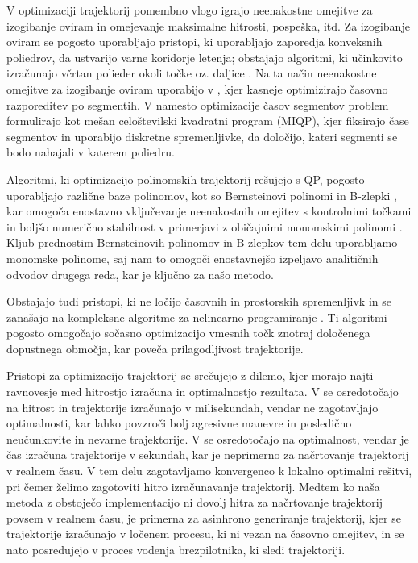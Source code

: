 \documentclass[mat2, tisk]{fmfdelo}
\begin{document}
V optimizaciji trajektorij pomembno vlogo igrajo neenakostne omejitve za izogibanje oviram in omejevanje maksimalne hitrosti, pospeška, itd. Za izogibanje oviram se pogosto uporabljajo pristopi, ki uporabljajo zaporedja konveksnih poliedrov, da ustvarijo varne koridorje letenja; obstajajo algoritmi, ki učinkovito izračunajo včrtan polieder okoli točke \cite{deits2015computing} oz. daljice \cite{liu2017planning}. Na ta način neenakostne omejitve za izogibanje oviram uporabijo v \cite{sun2021fast}, kjer kasneje optimizirajo časovno razporeditev po segmentih. V \cite{tordesillas2021faster} namesto optimizacije časov segmentov problem formulirajo kot mešan celoštevilski kvadratni program (MIQP), kjer fiksirajo čase segmentov in uporabijo diskretne spremenljivke, da določijo, kateri segmenti se bodo nahajali v katerem poliedru.

Algoritmi, ki optimizacijo polinomskih trajektorij rešujejo s \ac{QP}, pogosto uporabljajo različne baze polinomov, kot so Bernsteinovi polinomi \cite{sun2021fast, tordesillas2021faster} in B-zlepki \cite{zhou2020ego}, kar omogoča enostavno vključevanje neenakostnih omejitev s kontrolnimi točkami in boljšo numerično stabilnost v primerjavi z običajnimi monomskimi polinomi \cite{runge1901}. Kljub prednostim Bernsteinovih polinomov in B-zlepkov tem delu uporabljamo monomske polinome, saj nam to omogoči enostavnejšo izpeljavo analitičnih odvodov drugega reda, kar je ključno za našo metodo.

Obstajajo tudi pristopi, ki ne ločijo časovnih in prostorskih spremenljivk \cite{fridovich2018planning} in se zanašajo na kompleksne algoritme za nelinearno programiranje \cite{wachter2006implementation}. Ti algoritmi pogosto omogočajo sočasno optimizacijo vmesnih točk znotraj določenega dopustnega območja, kar poveča prilagodljivost trajektorije.

Pristopi za optimizacijo trajektorij se srečujejo z dilemo, kjer morajo najti ravnovesje med hitrostjo izračuna in optimalnostjo rezultata. V \cite{zhou2020ego} se osredotočajo na hitrost in trajektorije izračunajo v milisekundah, vendar ne zagotavljajo optimalnosti, kar lahko povzroči bolj agresivne manevre in posledično neučunkovite in nevarne trajektorije. V \cite{richter2016polynomial} se osredotočajo na optimalnost, vendar je čas izračuna trajektorije v sekundah, kar je neprimerno za načrtovanje trajektorij v realnem času. V tem delu zagotavljamo konvergenco k lokalno optimalni rešitvi, pri čemer želimo zagotoviti hitro izračunavanje trajektorij. Medtem ko naša metoda z obstoječo implementacijo ni dovolj hitra za načrtovanje trajektorij povsem v realnem času, je primerna za asinhrono generiranje trajektorij, kjer se trajektorije izračunajo v ločenem procesu, ki ni vezan na časovno omejitev, in se nato posredujejo v proces vodenja brezpilotnika, ki sledi trajektoriji.
\end{document}

